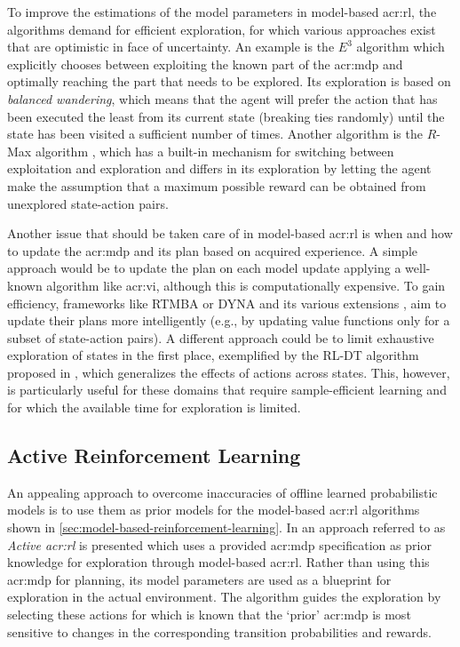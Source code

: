 To improve the estimations of the model parameters in model-based \acrshort{acr:rl}, the algorithms demand for efficient exploration, for which various approaches exist that are optimistic in face of uncertainty.
An example is the $E^3$ algorithm \cite{kearns2002near} which explicitly chooses between exploiting the known part of the \acrshort{acr:mdp} and optimally reaching the part that needs to be explored. 
Its exploration is based on \textit{balanced wandering}, which means that the agent will prefer the action that has been executed the least from its current state (breaking ties randomly) until the state has been visited a sufficient number of times.
Another algorithm is the $R$-Max algorithm \cite{Brafman2002}, which has a built-in mechanism for switching between exploitation and exploration and differs in its exploration by letting the agent make the assumption that a maximum possible reward can be obtained from unexplored state-action pairs.

Another issue that should be taken care of in model-based \acrshort{acr:rl} is when and how to update the \acrshort{acr:mdp} and its plan based on acquired experience. A simple approach would be to update the plan on each model update applying a well-known algorithm like \acrshort{acr:vi}, although this is computationally expensive.
To gain efficiency, frameworks like \textsc{RTMBA} \cite{hester2012rtmba} or \textsc{DYNA} and its various extensions \cite{silver2008sample}, aim to update their plans more intelligently (e.g., by updating value functions only for a subset of state-action pairs).
A different approach could be to limit exhaustive exploration of states in the first place, exemplified by the \textsc{RL-DT} algorithm proposed in \cite{hester2010generalized}, which generalizes the effects of actions across states.
This, however, is particularly useful for these domains that require sample-efficient learning and for which the available time for exploration is limited.

\subsection{Active Reinforcement Learning}
\label{sec:active-reinforcement-learning}

An appealing approach to overcome inaccuracies of offline learned probabilistic models is to use them as prior models for the model-based \acrshort{acr:rl} algorithms shown in \autoref{sec:model-based-reinforcement-learning}.
In \cite{epshteyn2008active} an approach referred to as \textit{Active \acrlong{acr:rl}} is presented which uses a provided \acrshort{acr:mdp} specification as prior knowledge for exploration through model-based \acrshort{acr:rl}.
Rather than using this \acrshort{acr:mdp} for planning, its model parameters are used as a blueprint for exploration in the actual environment.
The algorithm guides the exploration by selecting these actions for which is known that the `prior' \acrshort{acr:mdp} is most sensitive to changes in the corresponding transition probabilities and rewards.


